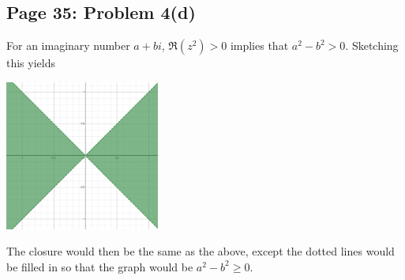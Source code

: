 \documentclass{article}
\begin{document}
\subsection*{Page 35: Problem 4(d)}
For an imaginary number $a+bi$, $\Re(z^2) > 0$ implies that 
$a^2-b^2 > 0$. Sketching this yields
\begin{center}
	\includegraphics[width=2in]{problem5.png}
\end{center}
The closure would then be the same as the above, 
except the dotted lines would be filled in so that the graph would be 
$a^2 -b^2 \geq 0$.
\end{document}
